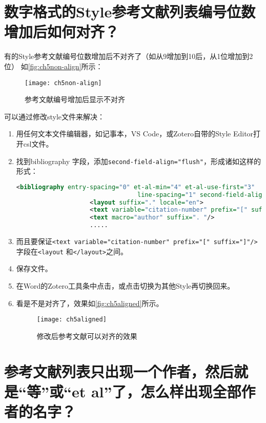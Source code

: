 \documentclass[cn,11pt,chinese]{elegantbook}
\begin{document}
		\section{数字格式的Style参考文献列表编号位数增加后如何对齐？}\label{sec:align}	
		有的Style参考文献编号位数增加后不对齐了（如从9增加到10后，从1位增加到2位）
		如\autoref{fig:ch5non-align}所示：
				\begin{figure}[ht]
					\centering
					\texttt{[image: ch5non-align]}
					\caption{参考文献编号增加后显示不对齐}
					\label{fig:ch5non-align}
				\end{figure}
				可以通过修改style文件来解决：
				\begin{enumerate}
					\item 用任何文本文件编辑器，如记事本，VS Code，或Zotero自带的Style Editor打开csl文件。
					\item 找到bibliography 字段，添加\verb|second-field-align="flush"|，形成诸如这样的形式：
					
					\begin{lstlisting}[language=XML]	
					<bibliography entry-spacing="0" et-al-min="4" et-al-use-first="3"
								 line-spacing="1" second-field-align="flush">
					<layout suffix="." locale="en">
					<text variable="citation-number" prefix="[" suffix="]"/>
					<text macro="author" suffix=". "/>
					.....
					\end{lstlisting}
					\item 而且要保证\verb|<text variable="citation-number" prefix="[" suffix="]"/>|
					字段在\verb|<layout| 和\verb|</layout>|之间。
					\item 保存文件。
					\item 在Word的Zotero工具条中点击，或点击切换为其他Style再切换回来。
					\item 看是不是对齐了，效果如\autoref{fig:ch5aligned}所示。
									\begin{figure}[ht]
										\centering
										\texttt{[image: ch5aligned]}
										\caption{修改后参考文献可以对齐的效果}
										\label{fig:ch5aligned}
									\end{figure}
				\end{enumerate}
				
		\section{参考文献列表只出现一个作者，然后就是“等”或“et al”了，怎么样出现全部作者的名字？}\label{sec:more-author}	
				
\end{document}
